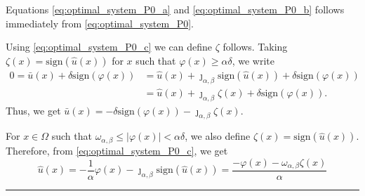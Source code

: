 \documentclass[11pt,a4paper]{amsart}
\newcommand{\kw}{\rule{2mm}{2mm}}
\newcommand{\om}{\Omega}
\newcommand{\sign}{\mathrm{sign}}
\renewenvironment{proof}{{Proof.}}{\hfill\kw}
\begin{document}
\begin{proof}
Equations \eqref{eq:optimal_system_P0_a} and  \eqref{eq:optimal_system_P0_b} follows immediately from \eqref{eq:optimal_system_P0}. 

Using \eqref{eq:optimal_system_P0_c} we can define $\zeta$ follows. Taking $\zeta(x) = \sign(\hat u (x))$ for $x$ such that $\varphi(x) \ge \alpha\delta$, we write
\begin{align}
0=\bar u(x) + \delta \sign(\varphi(x)) &= \hat u(x) + \jmath_{\alpha,\beta}\sign(\hat u(x)) + \delta \sign(\varphi(x)) \nonumber\\
& = \hat u(x) + \jmath_{\alpha,\beta} \zeta(x) + \delta \sign(\varphi(x)). \nonumber
\end{align}
Thus, we get $ \bar u(x) = -\delta\sign(\varphi(x)) - \jmath_{\alpha,\beta}\zeta(x).$ 

For $x \in \om$ such that $\omega_{\alpha,\beta}\le |\varphi(x)|<\alpha\delta$, we also define $\zeta(x)=\sign(\hat u(x))$. Therefore, from \eqref{eq:optimal_system_P0_c}, we get
$$\hat u(x) = -\frac{1}{\alpha}\varphi(x)-\jmath_{\alpha,\beta} \sign(\hat u(x))= \frac{-\varphi(x)-\omega_{\alpha,\beta} \zeta(x)}{\alpha}$$




\end{proof}
\end{document}
